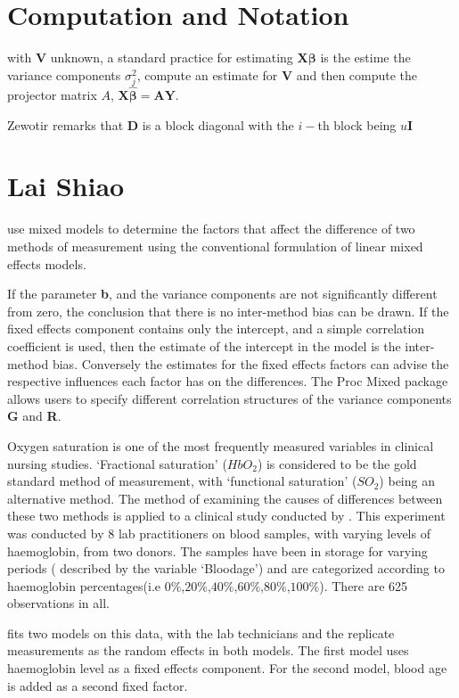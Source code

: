 \documentclass[12pt, a4paper]{report}
\theoremstyle{plain}
\theoremstyle{definition}
\theoremstyle{remark}
\begin{document}
\newpage
\section{Computation and Notation } %
with $\boldsymbol{V}$ unknown, a standard practice for estimating $\boldsymbol{X \beta}$ is the estime the variance components $\sigma^2_j$,
compute an estimate for $\boldsymbol{V}$ and then compute the projector matrix $A$, $\boldsymbol{X \hat{\beta}}  = \boldsymbol{AY}$.


Zewotir remarks that $\boldsymbol{D}$ is a block diagonal with the $i-$th block being $u \boldsymbol{I}$

\section{Lai Shiao}
\citet{LaiShiao} use mixed models to determine the factors that
affect the difference of two methods of measurement using the
conventional formulation of linear mixed effects models.

If the parameter \textbf{b}, and the variance components are not
significantly different from zero, the conclusion that there is no
inter-method bias can be drawn. If the fixed effects component
contains only the intercept, and a simple correlation coefficient
is used, then the estimate of the intercept in the model is the
inter-method bias. Conversely the estimates for the fixed effects
factors can advise the respective influences each factor has on
the differences. The Proc Mixed package allows users to specify
different correlation structures of the variance components
\textbf{G} and \textbf{R}.


Oxygen saturation is one of the most frequently measured variables
in clinical nursing studies. `Fractional saturation' ($HbO_{2}$)
is considered to be the gold standard method of measurement, with
`functional saturation' ($SO_{2}$) being an alternative method.
The method of examining the causes of differences between these
two methods is applied to a clinical study conducted by
\citet{Shiao}. This experiment was conducted by 8 lab
practitioners on blood samples, with varying levels of
haemoglobin, from two donors. The samples have been in storage for
varying periods ( described by the variable `Bloodage') and are
categorized according to haemoglobin percentages(i.e
$0\%$,$20\%$,$40\%$,$60\%$,$80\%$,$100\%$). There are 625
observations in all.

\citet{LaiShiao} fits two models on this data, with the lab
technicians and the replicate measurements as the random effects
in both models. The first model uses haemoglobin level as a fixed
effects component. For the second model, blood age is added as a
second fixed factor.
\end{document}
